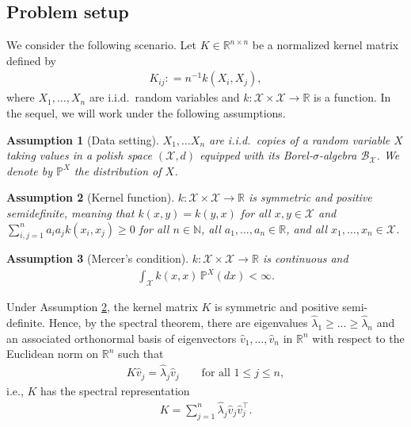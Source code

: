 \documentclass[a4paper,11pt]{article} %
\numberwithin{equation}{section}
\theoremstyle{definition}
\theoremstyle{remark}
\theoremstyle{plain}
\newtheorem{assumption}{Assumption}
\begin{document}
\subsection{Problem setup}%
\label{ssec_ProblemSetup}

We consider the following scenario. Let \( K \in \mathbb{R}^{n \times n} \) be a normalized kernel matrix defined by
\begin{align}
  K_{i j}: = n^{-1} k( X_{i}, X_{j} ),
\end{align}
where $ X_1, \dots, X_n $ are i.i.d.~random variables and $ k: \mathcal{X} \times \mathcal{X} \rightarrow \mathbb{R}$ is a function.
In the sequel, we will work under the following assumptions.

\begin{assumption}[Data setting]
  \label{ass_data}
  \( X_{1}, \dots X_{n} \) are i.i.d.~copies of a random variable \( X \) taking values in a polish space $(\mathcal{X}, d)$ equipped with its Borel-$ \sigma $-algebra $ \mathscr{B}_{\mathcal{X}}$. We denote by $ \mathbb{P}^X$ the distribution of $X$.
\end{assumption}

\begin{assumption}[Kernel function]
  \label{ass_Kernel}
  \( k: \mathcal{X} \times \mathcal{X} \to \mathbb{R} \) is symmetric and positive semidefinite, meaning that \( k(x, y) = k(y, x) \) for all \( x, y \in \mathcal{X} \) and \( \sum_{i, j = 1}^{n} a_{i} a_{j} k(x_{i}, x_{j}) \ge 0 \) for all \( n \in \mathbb{N} \), all \( a_1,\dots,a_n \in \mathbb{R} \), and all \( x_1,\dots,x_n \in\mathcal{X} \).
\end{assumption}

\begin{assumption}[Mercer's condition]
  \label{ass_Mercer}
  $ k: \mathcal{X} \times \mathcal{X} \to \mathbb{R} $ is continuous and
  \begin{align}
  \label{Eq_Mercer}
    \int_{\mathcal{X}} k(x, x) \, \mathbb{P}^X(dx) < \infty.
  \end{align}
\end{assumption}

Under Assumption \ref{ass_Kernel}, the kernel matrix $K$ is symmetric and positive semi-definite. 
Hence, by the spectral theorem, there are eigenvalues $\widehat\lambda_1\geq \dots\geq \widehat\lambda_n$ and an associated orthonormal basis of eigenvectors $\widehat v_1,\dots,\widehat v_n $ in $\mathbb{R}^n$ with respect to the Euclidean norm on \(\mathbb{R}^n\) such that 
\begin{align}
    K\widehat v_j=\widehat\lambda_j\widehat v_j\qquad \text{for all } 1\leq j\leq n,
\end{align}
i.e.,  \( K \) has the spectral representation
\begin{align}
  K = \sum_{j = 1}^{n} \widehat{\lambda}_{j} \widehat{v}_{j} \widehat{v}_{j}^{\top}.
\end{align}
\end{document}
